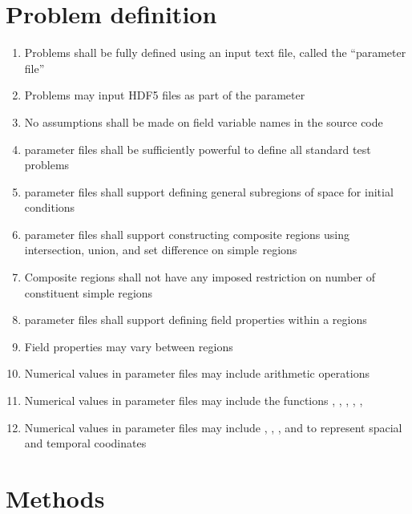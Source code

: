 \documentclass{book}
\begin{document}
\section{Problem definition}

\begin{enumerate}
 \item Problems shall be fully defined using an input text file, called
  the ``parameter file''
  \item Problems may input HDF5 files as part of the parameter
  \item No assumptions shall be made on field variable names in the source
  code
  \item parameter files shall be sufficiently powerful to define
  all standard test problems
  \item parameter files shall support defining general subregions of space for initial conditions
  \item parameter files shall support constructing composite
  regions using intersection, union, and set difference on simple
  regions
  \item Composite regions shall not have any imposed restriction on number
  of constituent simple regions
  \item parameter files shall support defining field properties
  within a regions
  \item Field properties may vary between regions
  \item Numerical values in parameter files may include arithmetic
  operations
  \item Numerical values in parameter files may include the
  functions , , , ,
  , 
  \item Numerical values in parameter files may include ,
  , , and  to represent spacial and temporal
  coodinates
\end{enumerate}

\section{Methods}
\end{document}
